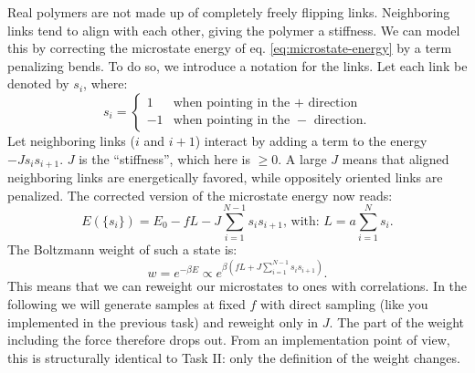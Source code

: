 \documentclass[11pt]{article}
\begin{document}
Real polymers are not made up of completely freely flipping links. Neighboring links tend to align with each other, giving the polymer a stiffness. We can model this by correcting the microstate energy of eq. \eqref{eq:microstate-energy} by a term penalizing bends. To do so, we introduce a notation for the links. Let each link be denoted by $s_i$, where:
\begin{equation}
 s_i = 
 \begin{cases} 
   1 & \text{when pointing in the }+\text{ direction}\\
   -1 & \text{when pointing in the }-\text{ direction}.
 \end{cases}
\end{equation}
Let neighboring links ($i$ and $i+1$) interact by adding a term to the energy $-Js_is_{i+1}$. $J$ is the ``stiffness'', which here is $\geq 0$. A large $J$ means that aligned neighboring links are energetically favored, while oppositely oriented links are penalized. The corrected version of the microstate energy now reads:
\begin{equation}
\label{eq:ising-hamiltonian}
  E(\{s_i\}) = E_0 - fL- J\sum^{N-1}_{i=1}s_i s_{i+1}\text{, with: } L = a\sum^N_{i=1} s_i.
\end{equation}
The Boltzmann weight of such a state is:
\begin{equation}
  w = e^{-\beta E} \propto e^{\beta (fL + J\sum^{N-1}_{i=1}s_i s_{i+1})}.
\end{equation}
This means that we can reweight our microstates to ones with correlations. In the following we will generate samples at fixed $f$ with direct sampling (like you implemented in the previous task) and reweight only in $J$. The part of the weight including the force therefore drops out. From an implementation point of view, this is structurally identical to Task II: only the definition of the weight changes.
\end{document}
